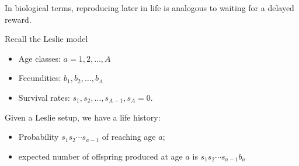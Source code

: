 \pause
In biological terms, reproducing later in life is analogous to waiting for a delayed reward. 
\pause
\bigskip

Recall the Leslie model \pause
\bigskip
\begin{itemize}
    \item Age classes: $a = 1, 2, \ldots, A$\pause
    \item Fecundities: $b_1, b_2, \ldots, b_A$\pause
    \item Survival rates: $s_1, s_2, \ldots, s_{A-1}, s_A = 0$. \pause
\end{itemize}
\bigskip

Given a Leslie setup, we have a life history: \pause
\bigskip

\begin{itemize}
    \item Probability $s_1 s_2 \cdots s_{a - 1}$ of reaching age $a$\pause;
    \item expected number of offspring produced at age $a$ is $ s_1 s_2 \cdots s_{a-1} b_a$
\end{itemize}



